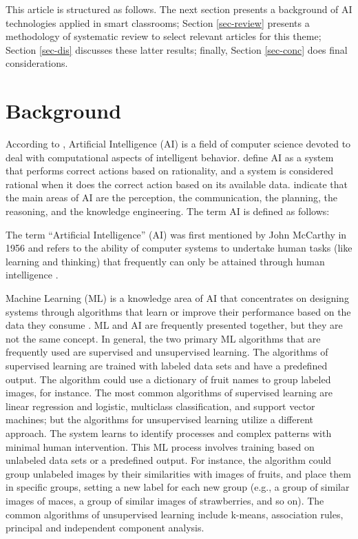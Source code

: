 \documentclass[english]{textolivre}
\begin{document}
This article is structured as follows. The next section presents a
background of AI technologies applied in smart classrooms; Section \ref{sec-review}
presents a methodology of systematic review to select relevant articles
for this theme; Section \ref{sec-dis} discusses these latter results; finally,
Section \ref{sec-conc} does final considerations.


\section{Background}\label{sec-back}
According to \textcite{Shapiro2003}, Artificial Intelligence (AI) is a field of
computer science devoted to deal with computational aspects of
intelligent behavior. \textcite[p.~37]{Russel2021} define AI as a
system that performs correct actions based on rationality, and a system
is considered rational when it does the correct action based on its
available data. \textcite{Zhang2021} indicate that the main areas of
AI are the perception, the communication, the planning, the reasoning,
and the knowledge engineering. The term AI is defined as follows:

The term ``Artificial Intelligence'' (AI) was first mentioned by John
McCarthy in 1956 and refers to the ability of computer systems to
undertake human tasks (like learning and thinking) that frequently can
only be attained through human intelligence
\cite[p.~2]{Dimitriadou2023}.

Machine Learning (ML) is a knowledge area of AI that concentrates on
designing systems through algorithms that learn or improve their
performance based on the data they consume
\cite{Oracle2024, Eglite2022}. ML and AI are frequently presented
together, but they are not the same concept. In general, the two primary
ML algorithms that are frequently used are supervised and unsupervised
learning. The algorithms of supervised learning are trained with labeled
data sets and have a predefined output. The algorithm could use a
dictionary of fruit names to group labeled images, for instance. The
most common algorithms of supervised learning are linear regression and
logistic, multiclass classification, and support vector machines; 
but the algorithms for unsupervised learning utilize a different
approach. The system learns to identify processes and complex patterns
with minimal human intervention. This ML process involves training based
on unlabeled data sets or a predefined output. For instance, the
algorithm could group unlabeled images by their similarities with images
of fruits, and place them in specific groups, setting a new label for
each new group (e.g., a group of similar images of maces, a group of
similar images of strawberries, and so on). The common algorithms of
unsupervised learning include k-means, association rules, principal and
independent component analysis.
\end{document}
